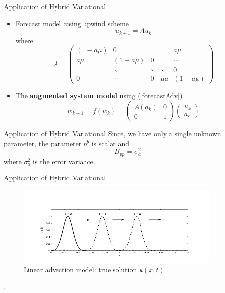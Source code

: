 \documentclass{beamer}
\begin{document}
\begin{frame}{Application of Hybrid Variational}
\begin{itemize}
    \item Forecast model :using upwind scheme
            \begin{equation}
            u_{k+1} = A  u_k 
            \label{forecastAdv}
            \end{equation}
            where 
            \[A = 
            \begin{pmatrix}
            (1-a\mu)  & 0&   &  &a\mu \\
             a\mu  & (1-a\mu) & 0&  &\cdots \\
             &\ddots & \ddots &\ddots & 0 \\
             0 & \cdots & 0 & \mu a & (1-a\mu)
            \end{pmatrix}
            \]
    \item The \textbf{augmented system model} using (\ref{forecastAdv})
            \begin{equation}
            w_{k+1} = f(w_k) = 
            \begin{pmatrix}
            A(a_k) & 0\\
            0 & 1
            \end{pmatrix} 
            \begin{pmatrix}
            u_k\\
            a_k
            \end{pmatrix} 
            \label{MatrixA}
            \end{equation}
\end{itemize}
\end{frame}
\begin{frame}{Application of Hybrid Variational}
    Since, we have only a single unknown parameter, the parameter $p^b$ is scalar and 
    \begin{equation}
        B_{pp} = \sigma_a^2
    \label{Bpp}
    \end{equation}
    where $\sigma_a^2$ is the error variance.
\end{frame}
\begin{frame}{Application of Hybrid Variational}
\begin{figure}[h]
    \begin{center}
    \includegraphics[width=10cm]{../Image/trueSolAdvection.png}
    \caption{Linear advection model: true solution $u(x, t)$}
    \label{trueSol}
    \end{center}
\end{figure}.
\end{frame}
\end{document}
